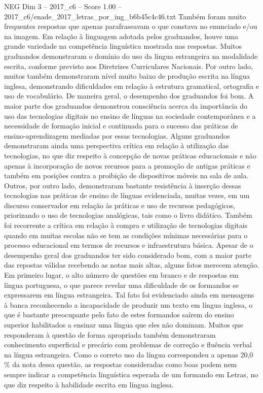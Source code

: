 \begin{textsample}{NEG Dim 3 – 2017\_c6 – Score 1.00 – 2017\_c6/enade\_2017\_letras\_por\_ing\_b6b45c4c46.txt}
Também foram muito frequentes respostas que apenas parafraseavam o que constava no enunciado e/ou na imagem.
Em relação à linguagem adotada pelos graduandos, houve uma grande variedade na competência linguística mostrada nas respostas.
Muitos graduandos demonstraram o domínio do uso da língua estrangeira na modalidade escrita, conforme previsto nos Diretrizes Curriculares Nacionais.
Por outro lado, muitos também demonstraram nível muito baixo de produção escrita na língua inglesa, demonstrando dificuldades em relação à estrutura gramatical, ortografia e uso de vocabulário.
De maneira geral, o desempenho dos graduandos foi bom.
A maior parte dos graduandos demonstrou consciência acerca da importância do uso das tecnologias digitais no ensino de línguas na sociedade contemporânea e a necessidade de formação inicial e continuada para o sucesso das práticas de ensino-aprendizagem mediadas por essas tecnologias.
Alguns graduandos demonstraram ainda uma perspectiva crítica em relação à utilização das tecnologias, no que diz respeito à concepção de novas práticas educacionais e não apenas à incorporação de novos recursos para a promoção de antigas práticas e também em posições contra a proibição de dispositivos móveis na sala de aula.
Outros, por outro lado, demonstraram bastante resistência à inserção dessas tecnologias nas práticas de ensino de línguas evidenciada, muitas vezes, em um discurso conservador em relação às práticas e uso de recursos pedagógicos, priorizando o uso de tecnologias analógicas, tais como o livro didático.
Também foi recorrente a crítica em relação à compra e utilização de tecnologias digitais quando em muitas escolas não se tem as condições mínimas necessárias para o processo educacional em termos de recursos e infraestrutura básica.
Apesar de o desempenho geral dos graduandos ter sido considerado bom, com a maior parte das repostas válidas recebendo as notas mais altas, alguns fatos merecem atenção.
Em primeiro lugar, o alto número de questões em branco e de respostas em língua portuguesa, o que parece revelar uma dificuldade de os formandos se expressarem em língua estrangeira.
Tal fato foi evidenciado ainda em mensagens à banca reconhecendo a incapacidade de produzir um texto em língua inglesa, o que é bastante preocupante pelo fato de estes formandos saírem do ensino superior habilitados a ensinar uma língua que eles não dominam.
Muitos que responderam à questão de forma apropriada também demonstraram conhecimento superficial e precário com problemas de correção e fluência verbal na língua estrangeira.
Como o correto uso da língua correspondeu a apenas 20,0 \% da nota dessa questão, as respostas consideradas como boas podem nem sempre indicar a competência linguística esperada de um formando em Letras, no que diz respeito à habilidade escrita em língua inglesa.

\end{textsample}
